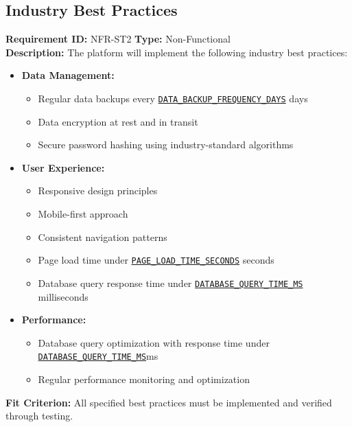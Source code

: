 \documentclass[12pt, titlepage]{article}
\begin{document}
\subsection{Industry Best Practices}
\textbf{Requirement ID:} NFR-ST2 \quad \textbf{Type:} Non-Functional \\
\textbf{Description:} The platform will implement the following industry best practices:
\begin{itemize}
    \item \textbf{Data Management:}
    \begin{itemize}
        \item Regular data backups every \hyperref[DATA_BACKUP_FREQUENCY_DAYS]{\texttt{DATA\_BACKUP\_FREQUENCY\_DAYS}} days
        \item Data encryption at rest and in transit
        \item Secure password hashing using industry-standard algorithms
    \end{itemize}

    \item \textbf{User Experience:}
    \begin{itemize}
        \item Responsive design principles
        \item Mobile-first approach
        \item Consistent navigation patterns
        \item Page load time under \hyperref[PAGE_LOAD_TIME_SECONDS]{\texttt{PAGE\_LOAD\_TIME\_SECONDS}} seconds
        \item Database query response time under \hyperref[DATABASE_QUERY_TIME_MS]{\texttt{DATABASE\_QUERY\_TIME\_MS}} milliseconds
    \end{itemize}

    \item \textbf{Performance:}
    \begin{itemize}
        \item Database query optimization with response time under \hyperref[DATABASE_QUERY_TIME_MS]{\texttt{DATABASE\_QUERY\_TIME\_MS}}ms
        \item Regular performance monitoring and optimization
    \end{itemize}
\end{itemize}
\textbf{Fit Criterion:} All specified best practices must be implemented and verified through testing.
\end{document}
